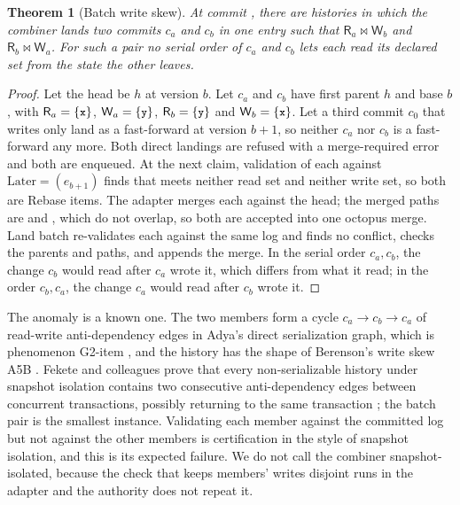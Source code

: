 \documentclass[11pt,letterpaper]{article}
\newtheorem{theorem}{Theorem}[section]
\theoremstyle{definition}
\theoremstyle{remark}
\newcommand{\R}{\mathsf{R}}
\newcommand{\W}{\mathsf{W}}
\newcommand{\meets}{\bowtie}
\newcommand{\Later}{\mathrm{Later}}
\newcommand{\mcode}[1]{\text{\texttt{\small #1}}}
\begin{document}
\begin{theorem}[Batch write skew]
\label{thm:tlsc:batchskew}
At commit , there are histories in which the combiner lands two commits $c_a$ and $c_b$ in one entry such that $\R_a\meets\W_b$ and $\R_b\meets\W_a$. For such a pair no serial order of $c_a$ and $c_b$ lets each read its declared set from the state the other leaves.
\end{theorem}

\begin{proof}
Let the head be $h$ at version $b$. Let $c_a$ and $c_b$ have first parent $h$ and base $b$, with $\R_a=\{\mcode{x}\}$, $\W_a=\{\mcode{y}\}$, $\R_b=\{\mcode{y}\}$ and $\W_b=\{\mcode{x}\}$. Let a third commit $c_0$ that writes only  land as a fast-forward at version $b+1$, so neither $c_a$ nor $c_b$ is a fast-forward any more. Both direct landings are refused with a merge-required error and both are enqueued. At the next claim, validation of each against $\Later=(e_{b+1})$ finds that  meets neither read set and neither write set, so both are Rebase items. The adapter merges each against the head; the merged paths are  and , which do not overlap, so both are accepted into one octopus merge. Land batch re-validates each against the same log and finds no conflict, checks the parents and paths, and appends the merge. In the serial order $c_a,c_b$, the change $c_b$ would read  after $c_a$ wrote it, which differs from what it read; in the order $c_b,c_a$, the change $c_a$ would read  after $c_b$ wrote it.
\end{proof}

The anomaly is a known one. The two members form a cycle $c_a\to c_b\to c_a$ of read-write anti-dependency edges in Adya's direct serialization graph, which is phenomenon G2-item \cite[Section 3.2.4]{adya1999thesis}, and the history has the shape of Berenson's write skew A5B \cite{berenson1995critique}. Fekete and colleagues prove that every non-serializable history under snapshot isolation contains two consecutive anti-dependency edges between concurrent transactions, possibly returning to the same transaction \cite[Theorem 2.1]{fekete2005serializable}; the batch pair is the smallest instance. Validating each member against the committed log but not against the other members is certification in the style of snapshot isolation, and this is its expected failure. We do not call the combiner snapshot-isolated, because the check that keeps members' writes disjoint runs in the adapter and the authority does not repeat it.
\end{document}
